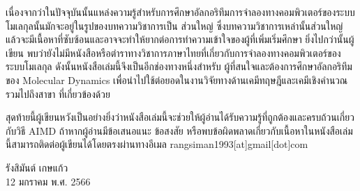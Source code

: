 {เนื่องจากว่าในปัจจุบันนั้นแหล่งความรู้สำหรับการศึกษาอัลกอริทึมการจำลองทางคอมพิวเตอร์ของระบบโมเลกุลนั้นมักจะอยู่ในรูปของบทความวิชาการเป็น%
ส่วนใหญ่ ซึ่งบทความวิชาการเหล่านั้นส่วนใหญ่แล้วจะมีเนื้อหาที่ซับซ้อนและอาจจะทำให้ยากต่อการทำความเข้าใจของผู้ที่เพิ่มเริ่มศึกษา ยิ่งไปกว่านั้นผู้เขียน%
พบว่ายังไม่มีหนังสือหรือตำราทางวิชาการภาษาไทยที่เกี่ยวกับการจำลองทางคอมพิวเตอร์ของระบบโมเลกุล ดังนั้นหนังสือเล่มนี้จึงเป็นอีกช่องทางหนึ่งสำหรับ%
ผู้ที่สนใจและต้องการศึกษาอัลกอริทึมของ Molecular Dynamics เพื่อนำไปใช้ต่อยอดในงานวิจัยทางด้านเคมีทฤษฎีและเคมีเชิงคำนวณ รวมไปถึงสาขา%
ที่เกี่ยวข้องด้วย

สุดท้ายนี้ผู้เขียนหวังเป็นอย่างยิ่งว่าหนังสือเล่มนี้จะช่วยให้ผู้อ่านได้รับความรู้ที่ถูกต้องและครบถ้วนเกี่ยวกับวิธี AIMD ถ้าหากผู้อ่านมีข้อเสนอแนะ ข้อสงสัย%
หรือพบข้อผิดพลาดเกี่ยวกับเนื้อหาในหนังสือเล่มนี้สามารถติดต่อผู้เขียนได้โดยตรงผ่านทางอีเมล rangsiman1993[at]gmail[dot]com

\medskip

\begin{flushright}
รังสิมันต์ เกษแก้ว \\
12 มกราคม พ.ศ. 2566
\end{flushright}
}

